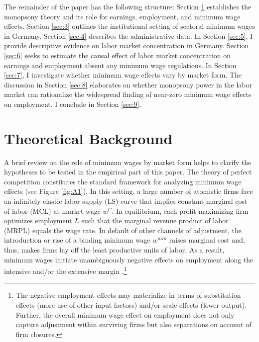 \documentclass[11pt,oneside,reqno,xcolor=dvipsnames]{article} %
\begin{document}
The remainder of the paper has the following structure: Section \ref{sec:2} establishes the monopsony theory and its role for earnings, employment, and minimum wage effects. Section \ref{sec:3} outlines the institutional setting of sectoral minimum wages in Germany. Section \ref{sec:4} describes the administrative data. In Section \ref{sec:5}, I provide descriptive evidence on labor market concentration in Germany. Section \ref{sec:6} seeks to estimate the causal effect of labor market concentration on earnings and employment absent any minimum wage regulations. In Section \ref{sec:7}, I investigate whether minimum wage effects vary by market form. The discussion in Section \ref{sec:8} elaborates on whether monopsony power in the labor market can rationalize the widespread finding of near-zero minimum wage effects on employment. I conclude in Section \ref{sec:9}.












\section{Theoretical Background}
\label{sec:2}


A brief review on the role of minimum wages by market form helps to clarify the hypotheses to be tested in the empirical part of this paper. The theory of perfect competition constitutes the standard framework for analyzing minimum wage effects (see Figure \ref{fig:A1}). In this setting, a large number of atomistic firms face an infinitely elastic labor supply (LS) curve that implies constant marginal cost of labor (MCL) at market wage $w^{C}$. In equilibrium, each profit-maximizing firm optimizes employment $L$ such that the marginal revenue product of labor (MRPL) equals the wage rate. In default of other channels of adjustment, the introduction or rise of a binding minimum wage $w^{min}$ raises marginal cost and, thus, makes firms lay off the least productive units of labor. As a result, minimum wages initiate unambiguously negative effects on employment along the intensive and/or the extensive margin \citep{Stigler1946}.\footnote{The negative employment effects may materialize in terms of substitution effects (more use of other input factors) and/or scale effects (lower output). Further, the overall minimum wage effect on employment does not only capture adjustment within surviving firms but also separations on account of firm closures.}
\end{document}
